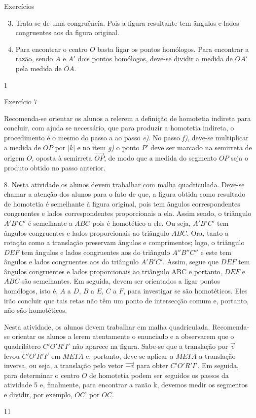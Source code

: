 \begin{answer}{Exercícios}
{\exerciselist
{
\begin{enumerate}\setcounter{enumi}{2}
\item Trata-se de uma congruência. Pois a figura resultante tem ângulos e lados congruentes aos da figura original.
\setcounter{enumi}{4}
\item Para encontrar o centro $O$ basta ligar os pontos homólogos. Para encontrar a razão, sendo $A$ e $A'$ dois pontos homólogos, deve-se dividir a medida de $OA'$ pela medida de $OA$.
\end{enumerate}}
}{1}
\end{answer}
\clearmargin
\begin{sugestions}{Exercício 7}
{
Recomenda-se orientar os alunos a relerem a definição de homotetia indireta para concluir, com ajuda se necessário, que para produzir a homotetia indireta, o procedimento é o mesmo do passo a ao passo \textit{e)}. No passo \textit{f)}, deve-se multiplicar a medida de $\overline{OP}$ por $|k|$ e no item \textit{g)} o ponto $P'$ deve ser marcado na semirreta de origem $O$, oposta à semirreta $\overrightarrow{OP}$, de modo que a medida do segmento $\overline{OP}$ seja o produto obtido no passo anterior.  

8.  Nesta atividade os alunos devem trabalhar com malha quadriculada. Deve-se chamar a atenção dos alunos para o fato de que, a figura obtida como resultado de homotetia é semelhante à figura original, pois tem ângulos correspondentes congruentes e lados correspondentes proporcionais a ela. Assim sendo, o triângulo $A'B'C'$ é semelhante a $ABC$ pois é homotético a ele. Ou seja, $A'B'C'$ tem ângulos congruentes e lados proporcionais ao triângulo $ABC$. Ora, tanto a rotação como a translação preservam ângulos e comprimentos; logo, o triângulo $DEF$ tem ângulos e lados congruentes aos do triângulo $A''B''C''$ e este tem ângulos e lados congruentes aos do triângulo $A'B'C'$. Assim, segue que $DEF$ tem ângulos congruentes e lados proporcionais ao triângulo ABC e portanto, $DEF$ e $ABC$ são semelhantes. Em seguida, devem ser orientados a ligar pontos homólogos, isto é, $A$ a $D$, $B$ a $E$, $C$ a $F$, para investigar se são homotéticos. Eles irão concluir que tais retas não têm um ponto de intersecção comum e, portanto, não são homotéticos.

Nesta atividade, os alunos devem trabalhar em malha quadriculada. Recomenda-se orientar os alunos a lerem atentamente o enunciado e a observarem que o quadrilátero $C'O'R'I'$ não aparece na figura. Sabe-se que a translação por $\overrightarrow{v}$ levou $C'O'R'I'$ em $META$ e, portanto, deve-se aplicar a $META$ a translação inversa, ou seja, a translação pelo vetor $\overrightarrow{-v}$ para obter $C'O'R'I'$. Em seguida, para determinar o centro $O$ de homotetia podem ser seguidos os passos da atividade 5 e, finalmente, para encontrar a razão k, devemos medir os segmentos e dividir, por exemplo, $OC’$ por $OC$. 
}{1}{1}
\end{sugestions}

